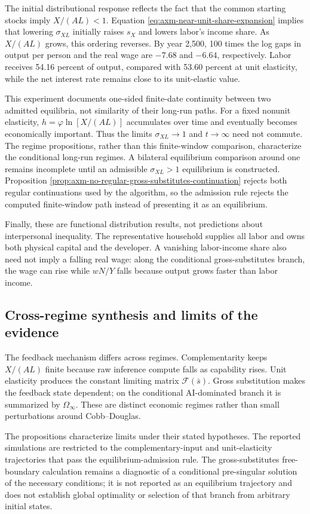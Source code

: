 The initial distributional response reflects the fact that the common starting
stocks imply \(X/(AL)<1\). Equation
\eqref{eq:axm-near-unit-share-expansion} implies that lowering
\(\sigma_{XL}\) initially raises \(s_X\) and lowers labor's income share. As
\(X/(AL)\) grows, this ordering reverses. By year 2,500, 100 times the log gaps
in output per person and the real wage are \(-7.68\) and \(-6.64\),
respectively. Labor receives 54.16 percent of output, compared with 53.60
percent at unit elasticity, while the net interest rate remains close to its
unit-elastic value.

This experiment documents one-sided finite-date continuity between two admitted
equilibria, not similarity of their long-run paths. For a fixed nonunit
elasticity,
\(h=\varphi\ln[X/(AL)]\) accumulates over time and eventually becomes
economically important. Thus the limits \(\sigma_{XL}\to1\) and
\(t\to\infty\) need not commute. The regime propositions, rather than this
finite-window comparison, characterize the conditional long-run regimes. A
bilateral equilibrium comparison around one remains incomplete until an
admissible \(\sigma_{XL}>1\) equilibrium is constructed. Proposition
\ref{prop:axm-no-regular-gross-substitutes-continuation} rejects both regular
continuations used by the algorithm, so the admission rule rejects the computed
finite-window path instead of presenting it as an equilibrium.

Finally, these are functional distribution results, not predictions about
interpersonal inequality. The representative household supplies all labor and
owns both physical capital and the developer. A vanishing labor-income share
also need not imply a falling real wage: along the conditional gross-substitutes
branch, the wage can rise while \(wN/Y\) falls because output grows faster than
labor income.

\subsection{Cross-regime synthesis and limits of the evidence}

The feedback mechanism differs across regimes. Complementarity keeps \(X/(AL)\)
finite because raw inference compute falls as capability rises. Unit elasticity
produces the constant limiting matrix \(\mathcal F(\bar s)\). Gross substitution
makes the feedback state dependent; on the conditional AI-dominated branch it is
summarized by \(\Omega_\infty\). These are distinct economic regimes rather than
small perturbations around Cobb--Douglas.

The propositions characterize limits under their stated hypotheses. The
reported simulations are restricted to the complementary-input and
unit-elasticity trajectories that pass the equilibrium-admission rule. The
gross-substitutes free-boundary calculation remains a diagnostic of a
conditional pre-singular solution of the necessary conditions; it is not
reported as an equilibrium trajectory and does not establish global optimality
or selection of that branch from arbitrary initial states.
